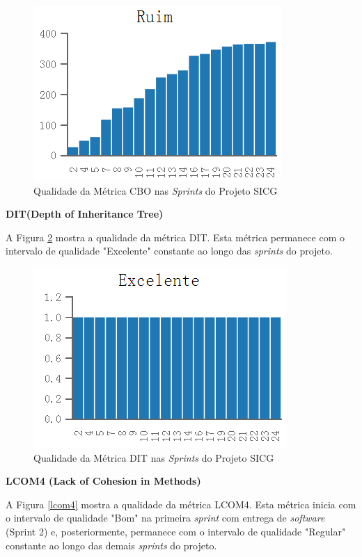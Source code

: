\begin{figure}[H]
		\centering
			\includegraphics[scale=1.0]{figuras/cbo.png}
		\caption{Qualidade da Métrica CBO nas \textit{Sprints} do Projeto SICG}
		\label{cbo}
\end{figure}

\textbf{DIT(Depth of Inheritance Tree)}

A Figura \ref{dit} mostra a qualidade da métrica DIT. Esta métrica permanece com o intervalo de qualidade "Excelente" constante ao longo das \textit{sprints} do projeto.

\begin{figure}[H]
		\centering
			\includegraphics[scale=1.0]{figuras/dit.png}
		\caption{Qualidade da Métrica DIT nas \textit{Sprints} do Projeto SICG}
		\label{dit}
\end{figure}


\textbf{LCOM4 (Lack of Cohesion in Methods)} 

A Figura \ref{lcom4} mostra a qualidade da métrica LCOM4. Esta métrica inicia com o intervalo de qualidade "Bom" na primeira \textit{sprint} com entrega de \textit{software} (Sprint 2) e, posteriormente, permanece com o intervalo de qualidade "Regular" constante ao longo das demais \textit{sprints} do projeto.

